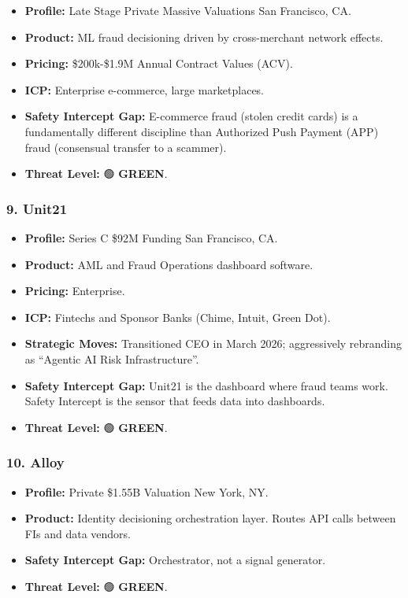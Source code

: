 \documentclass[
]{article}
\providecommand{\tightlist}{%
  \setlength{\itemsep}{0pt}\setlength{\parskip}{0pt}}
\begin{document}
\begin{itemize}
\tightlist
\item
  \textbf{Profile:} Late Stage Private \textbar{} Massive Valuations
  \textbar{} San Francisco, CA.
\item
  \textbf{Product:} ML fraud decisioning driven by cross-merchant
  network effects.
\item
  \textbf{Pricing:} \$200k-\$1.9M Annual Contract Values (ACV).
\item
  \textbf{ICP:} Enterprise e-commerce, large marketplaces.
\item
  \textbf{Safety Intercept Gap:} E-commerce fraud (stolen credit cards)
  is a fundamentally different discipline than Authorized Push Payment
  (APP) fraud (consensual transfer to a scammer).
\item
  \textbf{Threat Level:} 🟢 \textbf{GREEN}.
\end{itemize}

\subsubsection{9. Unit21}\label{unit21}

\begin{itemize}
\tightlist
\item
  \textbf{Profile:} Series C \textbar{} \$92M Funding \textbar{} San
  Francisco, CA.
\item
  \textbf{Product:} AML and Fraud Operations dashboard software.
\item
  \textbf{Pricing:} Enterprise.
\item
  \textbf{ICP:} Fintechs and Sponsor Banks (Chime, Intuit, Green Dot).
\item
  \textbf{Strategic Moves:} Transitioned CEO in March 2026; aggressively
  rebranding as ``Agentic AI Risk Infrastructure''.
\item
  \textbf{Safety Intercept Gap:} Unit21 is the dashboard where fraud
  teams work. Safety Intercept is the sensor that feeds data into
  dashboards.
\item
  \textbf{Threat Level:} 🟢 \textbf{GREEN}.
\end{itemize}

\subsubsection{10. Alloy}\label{alloy}

\begin{itemize}
\tightlist
\item
  \textbf{Profile:} Private \textbar{} \$1.55B Valuation \textbar{} New
  York, NY.
\item
  \textbf{Product:} Identity decisioning orchestration layer. Routes API
  calls between FIs and data vendors.
\item
  \textbf{Safety Intercept Gap:} Orchestrator, not a signal generator.
\item
  \textbf{Threat Level:} 🟢 \textbf{GREEN}.
\end{itemize}
\end{document}
